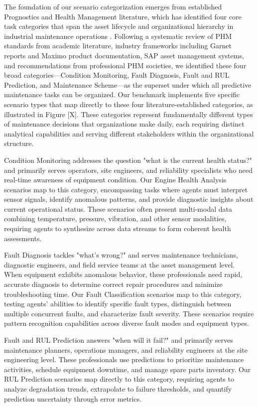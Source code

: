 \documentclass[conference]{IEEEtran}
\begin{document}
The foundation of our scenario categorization emerges from established Prognostics and Health Management literature, which has identified four core task categories that span the asset lifecycle and organizational hierarchy in industrial maintenance operations \cite{yang2025phmbench}. Following a systematic review of PHM standards from academic literature, industry frameworks including Garnet reports and Maximo product documentation, SAP asset management systems, and recommendations from professional PHM societies, we identified these four broad categories—Condition Monitoring, Fault Diagnosis, Fault and RUL Prediction, and Maintenance Scheme—as the superset under which all predictive maintenance tasks can be organized. Our benchmark implements five specific scenario types that map directly to these four literature-established categories, as illustrated in Figure [X]. These categories represent fundamentally different types of maintenance decisions that organizations make daily, each requiring distinct analytical capabilities and serving different stakeholders within the organizational structure.

Condition Monitoring addresses the question "what is the current health status?" and primarily serves operators, site engineers, and reliability specialists who need real-time awareness of equipment condition. Our Engine Health Analysis scenarios map to this category, encompassing tasks where agents must interpret sensor signals, identify anomalous patterns, and provide diagnostic insights about current operational status. These scenarios often present multi-modal data combining temperature, pressure, vibration, and other sensor modalities, requiring agents to synthesize across data streams to form coherent health assessments.

Fault Diagnosis tackles "what's wrong?" and serves maintenance technicians, diagnostic engineers, and field service teams at the asset management level. When equipment exhibits anomalous behavior, these professionals need rapid, accurate diagnosis to determine correct repair procedures and minimize troubleshooting time. Our Fault Classification scenarios map to this category, testing agents' abilities to identify specific fault types, distinguish between multiple concurrent faults, and characterize fault severity. These scenarios require pattern recognition capabilities across diverse fault modes and equipment types.

Fault and RUL Prediction answers "when will it fail?" and primarily serves maintenance planners, operations managers, and reliability engineers at the site engineering level. These professionals use predictions to prioritize maintenance activities, schedule equipment downtime, and manage spare parts inventory. Our RUL Prediction scenarios map directly to this category, requiring agents to analyze degradation trends, extrapolate to failure thresholds, and quantify prediction uncertainty through error metrics.
\end{document}
